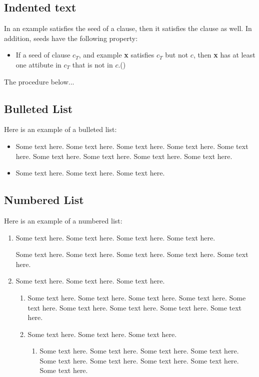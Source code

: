 \begin{article}
\subsection{Indented text}
In an example satisfies the seed of a clause, then it satisfies the clause
as well. In addition, seeds have the following property:

\begin{itemize}
\item[] 
If a seed of clause $c_T$, and example {\bf x} satisfies $c_T$ but
not $c$, then {\bf x} has at least one attibute in $c_T$ that
is not in $c$.\hfill({\tt*})
\end{itemize}
The procedure below...

\subsection{Bulleted List}
Here is an example of a bulleted list:
\begin{itemize}
\item
Some text here. Some text here. Some text here. Some text here. 
Some text here.
Some text here. Some text here. Some text here. Some text here.

\item
Some text here. Some text here. Some text here.
\end{itemize}


\subsection{Numbered List}
Here is an example of a numbered list:
\begin{enumerate}
\item
Some text here. Some text here. Some text here. Some text here.

Some text here. Some text here. Some text here. Some text here. Some
text here.

\item
Some text here. Some text here. Some text here.

\begin{enumerate}
\item
Some text here. Some text here. Some text here. Some text here. Some
text here.  Some text here. Some text here. Some text here. Some text
here.

\item
Some text here. Some text here. Some text here.
\begin{enumerate}
\item
Some text here. Some text here. Some text here. Some text here. Some
text here.  Some text here. Some text here. Some text here. Some text
here.


\end{enumerate}
\end{enumerate}
\end{enumerate}
\end{article}
